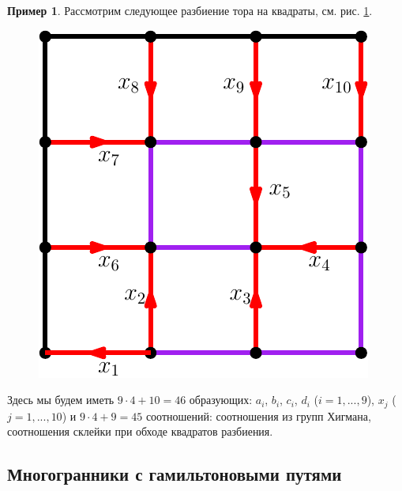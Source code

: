 \documentclass[14pt, dvipsnames, twoside]{extarticle}
\theoremstyle{definition}
\newtheorem{example}{Пример}
\theoremstyle{remark}
\begin{document}
\begin{example}

Рассмотрим следующее разбиение тора на квадраты, см. рис. \ref{pict_torus}.

\begin{figure}
\begin{center}
\includegraphics[scale=0.8]{Torus}
\caption{}\label{pict_torus}
\end{center}
\end{figure}

Здесь мы будем иметь $9\cdot 4 + 10 = 46$ образующих: $a_i$, $b_i$, $c_i$, $d_i$ ($i = 1, ..., 9$), $x_j$ ($j = 1, ..., 10$) и $9\cdot 4 + 9 = 45$ соотношений: соотношения из групп Хигмана, соотношения склейки при обходе квадратов разбиения.

\end{example}



















\subsection{Многогранники с гамильтоновыми путями}  
\end{document}
